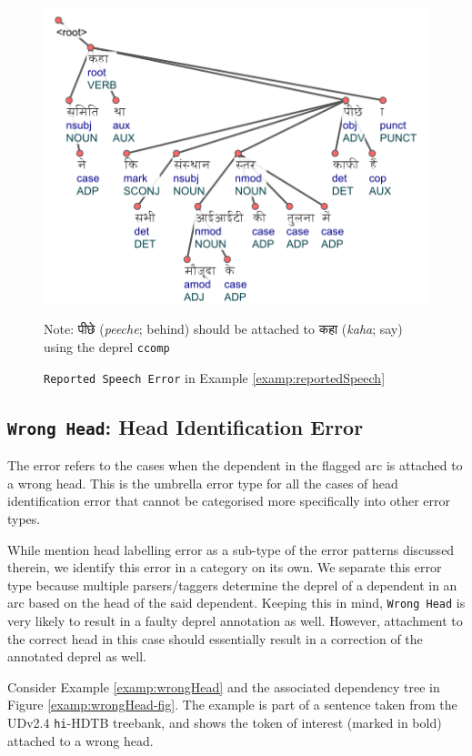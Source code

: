 \begin{figure}[H]
    \centering
    \includegraphics[scale=0.90]{img/reportedSpeech.png}
    \caption{\texttt{Reported Speech Error} in Example \ref{examp:reportedSpeech}}
    Note: \texthindi{पीछे} (\textit{peeche}; behind) should be attached to 
   \texthindi{कहा} (\textit{kaha}; say) using the deprel \texttt{ccomp}
    \label{examp:reportedSpeech-fig}
\end{figure}

\subsection[Head Identification Error: \texttt{Wrong Head}]{\texttt{Wrong Head}: Head Identification Error}

The error refers to the cases when the dependent in the flagged arc is attached to a wrong head. This is the umbrella error type for all the cases of head identification error that cannot be categorised more specifically into other error types.

While \cite{alzetta2017dangerous} mention head labelling error as a sub-type of the error patterns discussed therein, we identify this error in a category on its own. We separate this error type because multiple parsers/taggers determine the deprel of a dependent in an arc based on the head of the said dependent. Keeping this in mind, \texttt{Wrong Head} is very likely to result in a faulty deprel annotation as well. However, attachment to the correct head in this case should essentially result in a correction of the annotated deprel as well.

Consider Example \ref{examp:wrongHead} and the associated dependency tree in Figure \ref{examp:wrongHead-fig}. The example is part of a sentence taken from the UDv2.4 \texttt{hi}-HDTB treebank, and shows the token of interest (marked in bold) attached to a wrong head.

